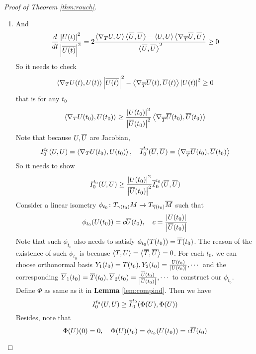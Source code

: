 \begin{enumerate}[label=\arabic{*}.]
\begin{proof}[Proof of Theorem \ref{thm:rouch}]
\begin{enumerate}[label=\Roman*.]
			\item And
			\begin{equation*}
				\frac{d}{dt}\frac{\left\lvert U(t)\right\lvert^2}{\left\lvert\overline{U(t)}\right\lvert^2} = 2\frac{\left\langle \nabla_TU,U \right\rangle\left\langle \overline{U},\overline{U} \right\rangle - \left\langle U,U \right\rangle\left\langle \nabla_{\overline{T}}\overline{U},\overline{U} \right\rangle}{\left\langle \overline{U},\overline{U} \right\rangle^2} \geq 0
			\end{equation*}
			So it needs to check
			\begin{equation*}
				\left\langle \nabla_TU(t),U(t) \right\rangle\left\lvert\overline{U(t)}\right\lvert^2 - \left\langle \nabla_{\overline{T}}\overline{U}(t),\overline{U}(t) \right\rangle\left\lvert U(t)\right\lvert^2 \geq 0
			\end{equation*}
			that is for any $t_0$
			\begin{equation*}
				\left\langle \nabla_TU(t_0),U(t_0) \right\rangle \geq \frac{\left\lvert U(t_0)\right\lvert^2}{\left\lvert\overline{U}(t_0)\right\lvert^2} \left\langle \nabla_{\overline{T}}\overline{U}(t_0),\overline{U}(t_0) \right\rangle
			\end{equation*}
			Note that because $U,\overline{U}$ are Jacobian,
			\begin{equation*}
				I_0^{t_0}(U,U) = \left\langle \nabla_TU(t_0),U(t_0) \right\rangle, \quad \overline{I}_0^{t_0}(\overline{U},\overline{U}) =\left\langle \nabla_{\overline{T}}\overline{U}(t_0),\overline{U}(t_0) \right\rangle
			\end{equation*}
			So it needs to show
			\begin{equation*}
				I_0^{t_0}(U,U) \geq \frac{\left\lvert U(t_0)\right\lvert^2}{\left\lvert\overline{U}(t_0)\right\lvert^2} \overline{I}_0^{t_0}(\overline{U},\overline{U})
			\end{equation*}
			Consider a linear isometry $\phi_{t_0} \colon T_{\gamma(t_0)}M \rightarrow T_{\overline{\gamma}(t_0)}\overline{M}$ such that
			\begin{equation*}
				\phi_{t_0}(U(t_0)) = c\overline{U}(t_0),\quad c=\frac{\left\lvert U(t_0)\right\lvert}{\left\lvert\overline{U}(t_0)\right\lvert} 
			\end{equation*}
			Note that such $\phi_{t_0}$ also needs to satisfy $\phi_{t_0}(T(t_0)) = \overline{T}(t_0)$. The reason of the existence of such $\phi_{t_0}$ is because $\left\langle T,U \right\rangle =\left\langle \overline{T},\overline{U} \right\rangle = 0$. For each $t_0$, we can choose orthonormal basis $Y_1(t_0) = T(t_0),Y_2(t_0) = \frac{U(t_0)}{\left\lvert U(t_0)\right\lvert},\cdots$ and the corresponding $\overline{Y}_1(t_0) = \overline{T}(t_0),\overline{Y}_2(t_0) = \frac{\overline{U}(t_0)}{\left\lvert\overline{U}(t_0)\right\lvert},\cdots$ to construct our $\phi_{t_0}$. Define $\Phi$ as same as it in \textbf{Lemma} \ref{lem:compind}.  
			Then we have
			\begin{equation*}
				I_0^{t_0}(U,U) \geq \overline{I}_0^{t_0}(\Phi(U),\Phi(U))
			\end{equation*}
			Besides, note that
			\begin{equation*}
				\Phi(U)(0) = 0,\quad \Phi(U)(t_0) = \phi_{t_0}(U(t_0)) = c\clo{U}(t_0)

\end{equation*}
\end{enumerate}
\end{proof}
\end{enumerate}
